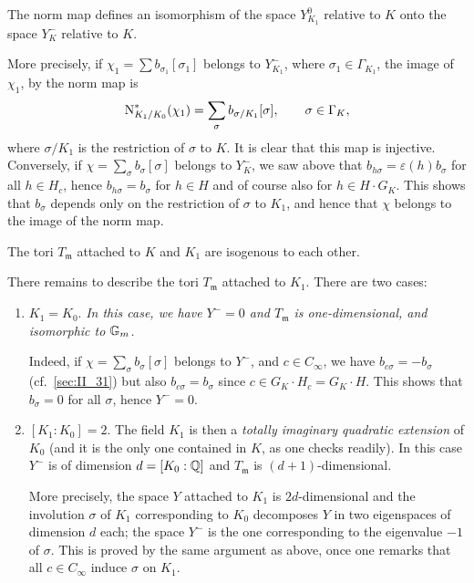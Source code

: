 \begin{prop}
	The norm map defines an isomorphism of the space $Y_{K_1}^0$ relative
	to $K$ onto the space $Y_K^-$ relative to $K$.
\end{prop}

More precisely, if $\chi_1 = \sum b_{\sigma_1}[\sigma_1]$ belongs to
\dpage
$Y_{K_1}^-$, where $\sigma_1 \in \Gamma_{K_1}$, the image of $\chi_1$, by the
norm map is
\[
	\operatorname{N}_{K_1/K_0}^*(\chi_1) = \sum_{\sigma} b_{\sigma/K_1}[\sigma], \qquad
	\sigma \in \Gamma_K,
\]
where $\sigma/K_1$ is the restriction of $\sigma$ to $K$. It is clear that this
map is injective. Conversely, if $\chi = \sum_{\sigma} b_\sigma[\sigma]$
belongs to $Y_K^-$, we saw above that $b_{h\sigma} = \varepsilon(h)b_\sigma$
for all $h \in H_c$, hence $b_{h \sigma} = b_\sigma$ for $h \in H$ and of
course also for $h \in H\cdot G_K$. This shows that $b_\sigma$ depends only on
the restriction of $\sigma$ to $K_1$, and hence that $\chi$ belongs to the
image of the norm map.

\begin{corp}
	The tori $T_{\mathfrak{m}}$ attached to $K$ and $K_1$ are isogenous to
	each other.
\end{corp}
There remains to describe the tori $T_{\mathfrak{m}}$ attached to $K_1$.  There
are two cases:
\begin{enumerate}[(1)]
\item $K_1 = K_0$.
	\emph{In this case, we have $Y^- = 0$ and $T_{\mathfrak{m}}$ is
	one-dimensional, and isomorphic to $\mathbb{G}_m$.}

	Indeed, if $\chi = \sum_{\sigma} b_\sigma[\sigma]$ belongs to $Y^-$,
	and $c \in C_\infty$, we have $b_{c \sigma} = -b_\sigma$ (cf.\
	\ref{sec:II_31}) but also $b_{c \sigma} = b_\sigma$ since $c \in G_K
	\cdot H_c = G_K \cdot H$. This shows that $b_\sigma = 0$ for all
	$\sigma$, hence $Y^- = 0$.

\item $[K_1 : K_0] = 2$.
	The field $K_1$ is then a \emph{totally imaginary quadratic extension}
	of $K_0$ (and it is the only one contained in $K$, as one checks
	readily). In this case $Y^-$ is of dimension $d = [K_0 : \mathbb{Q}]$ and
	$T_{\mathfrak{m}}$ is $(d+1)$-dimensional.

	More precisely, the space $Y$ attached to $K_1$ is $2d$-dimensional
	\dpage
	and the involution $\sigma$ of $K_1$ corresponding to $K_0$ decomposes
	$Y$ in two eigenspaces of dimension $d$ each; the space $Y^-$ is the
	one corresponding to the eigenvalue $-1$ of $\sigma$. This is proved by
	the same argument as above, once one remarks that all $c \in C_\infty$
	induce $\sigma$ on $K_1$.
\end{enumerate}


